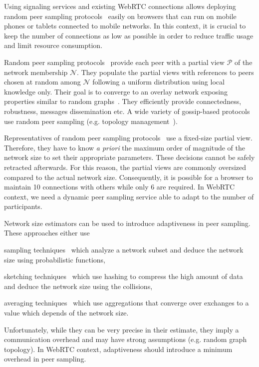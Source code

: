 Using signaling services and existing WebRTC connections allows deploying
random peer sampling protocols~\cite{jelasity2004peer} easily on browsers that
can run on mobile phones or tablets connected to mobile networks. In this
context, it is crucial to keep the number of connections as low as possible in
order to reduce traffic usage and limit resource consumption.

Random peer sampling protocols~\cite{jelasity2004peer} provide each
peer with a partial view $\mathcal{P}$ of the network membership
$\mathcal{N}$. They populate the partial views with references to
peers chosen at random among $\mathcal{N}$ following a uniform
distribution using local knowledge only. Their goal is to converge to
an overlay network exposing properties similar to random
graphs~\cite{erdos1959random}. They efficiently provide connectedness,
robustness, messages dissemination etc. A wide variety of gossip-based
protocols use random peer sampling (e.g. topology
management~\cite{voulgaris2005epidemic, jelasity2009tman,
  dabek2004vivaldi}).

Representatives of random peer sampling
protocols~\cite{voulgaris2005cyclon, eugster2003lightweight,
  tolgyeski2009adaptive} use a fixed-size partial view. Therefore, they
have to know \emph{a priori} the maximum order of magnitude of the
network size to set their appropriate parameters. These decisions
cannot be safely retracted afterwards. For this reason, the partial
views are commonly oversized compared to the actual network
size. Consequently, it is possible for a browser to maintain 10
connections with others while only 6 are required. In WebRTC context,
we need a dynamic peer sampling service able to adapt to the number of
participants.

Network size estimators can be used to introduce adaptiveness in peer
sampling. These approaches either use
\begin{inparaenum}[(i)]
\item sampling techniques~\cite{mane05network, ganesh2007peer,
    kostoulas2007active} which analyze a network subset and deduce the network
  size using probabilistic functions,
\item sketching techniques~\cite{flajolet2008hyperloglog, baquero2012extrema}
  which use hashing to compress the high amount of data and deduce the network
  size using the collisions,
\item averaging techniques~\cite{jelasity2004epidemic, blasa2011symmetric}
  which use aggregations that converge over exchanges to a value which depends
  of the network size.
\end{inparaenum}
Unfortunately, while they can be very precise in their estimate, they
imply a communication overhead and may have strong assumptions
(e.g. random graph topology). In WebRTC context, adaptiveness should
introduce a minimum overhead in peer sampling.

